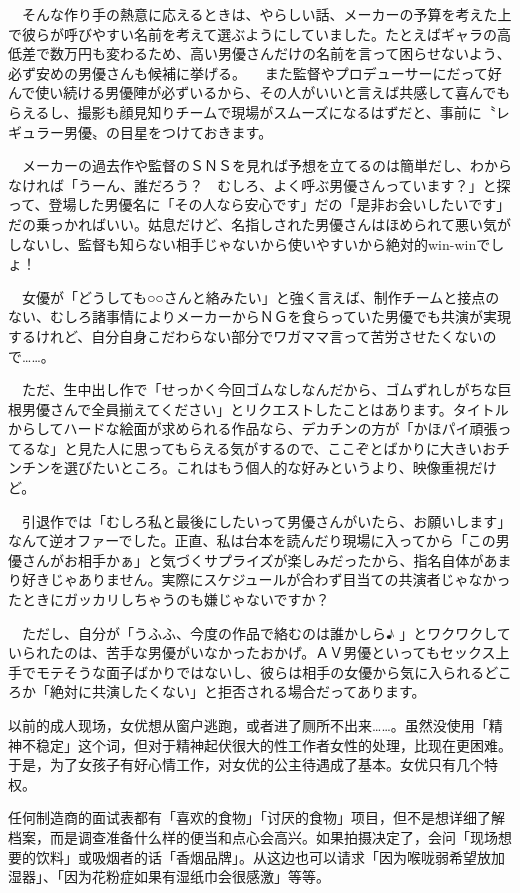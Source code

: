 \documentclass[12pt,UTF8]{ctexbook}
\begin{document}
　そんな作り手の熱意に応えるときは、やらしい話、メーカーの予算を考えた上で彼らが呼びやすい名前を考えて選ぶようにしていました。たとえばギャラの高低差で数万円も変わるため、高い男優さんだけの名前を言って困らせないよう、必ず安めの男優さんも候補に挙げる。
　また監督やプロデューサーにだって好んで使い続ける男優陣が必ずいるから、その人がいいと言えば共感して喜んでもらえるし、撮影も顔見知りチームで現場がスムーズになるはずだと、事前に〝レギュラー男優〟の目星をつけておきます。

　メーカーの過去作や監督のＳＮＳを見れば予想を立てるのは簡単だし、わからなければ「うーん、誰だろう？　むしろ、よく呼ぶ男優さんっています？」と探って、登場した男優名に「その人なら安心です」だの「是非お会いしたいです」だの乗っかればいい。姑息だけど、名指しされた男優さんはほめられて悪い気がしないし、監督も知らない相手じゃないから使いやすいから絶対的win-winでしょ！

　女優が「どうしても○○さんと絡みたい」と強く言えば、制作チームと接点のない、むしろ諸事情によりメーカーからＮＧを食らっていた男優でも共演が実現するけれど、自分自身こだわらない部分でワガママ言って苦労させたくないので……。

　ただ、生中出し作で「せっかく今回ゴムなしなんだから、ゴムずれしがちな巨根男優さんで全員揃えてください」とリクエストしたことはあります。タイトルからしてハードな絵面が求められる作品なら、デカチンの方が「かほパイ頑張ってるな」と見た人に思ってもらえる気がするので、ここぞとばかりに大きいおチンチンを選びたいところ。これはもう個人的な好みというより、映像重視だけど。

　引退作では「むしろ私と最後にしたいって男優さんがいたら、お願いします」なんて逆オファーでした。正直、私は台本を読んだり現場に入ってから「この男優さんがお相手かぁ」と気づくサプライズが楽しみだったから、指名自体があまり好きじゃありません。実際にスケジュールが合わず目当ての共演者じゃなかったときにガッカリしちゃうのも嫌じゃないですか？

　ただし、自分が「うふふ、今度の作品で絡むのは誰かしら♪
 」とワクワクしていられたのは、苦手な男優がいなかったおかげ。ＡＶ男優といってもセックス上手でモテそうな面子ばかりではないし、彼らは相手の女優から気に入られるどころか「絶対に共演したくない」と拒否される場合だってあります。


 
以前的成人现场，女优想从窗户逃跑，或者进了厕所不出来……。虽然没使用「精神不稳定」这个词，但对于精神起伏很大的性工作者女性的处理，比现在更困难。于是，为了女孩子有好心情工作，对女优的公主待遇成了基本。女优只有几个特权。

任何制造商的面试表都有「喜欢的食物」「讨厌的食物」项目，但不是想详细了解档案，而是调查准备什么样的便当和点心会高兴。如果拍摄决定了，会问「现场想要的饮料」或吸烟者的话「香烟品牌」。从这边也可以请求「因为喉咙弱希望放加湿器」、「因为花粉症如果有湿纸巾会很感激」等等。
\end{document}

